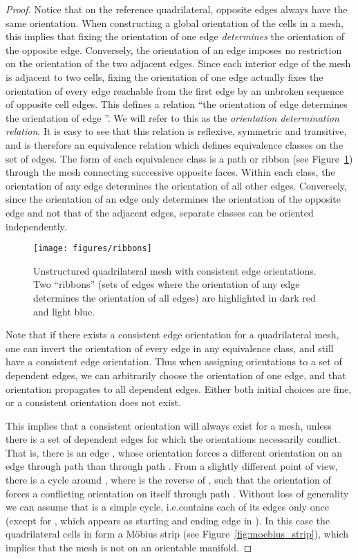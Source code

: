 \documentclass[oneeqnum,onethmnum,onefignum,onetabnum]{siamltex1213}
\begin{document}
\begin{proof}
  Notice that on the reference quadrilateral, opposite edges always have the
  same orientation. When constructing a global orientation of the cells in a
  mesh, this implies that fixing the orientation of one edge
  \emph{determines} the orientation of the opposite edge. Conversely, the
  orientation of an edge imposes no restriction on the orientation of the
  two adjacent edges. Since each interior edge of the mesh is adjacent to
  two cells, fixing the orientation of one edge actually fixes the
  orientation of every edge reachable from the first edge by an unbroken
  sequence of opposite cell edges. This defines a relation ``the orientation
  of edge  determines the orientation of edge ''.  We will refer to
  this as the \emph{orientation determination relation}. It is easy to see
  that this relation is reflexive, symmetric and transitive, and is
  therefore an equivalence relation which defines equivalence classes on
  the set of edges. The form of each equivalence class is a path or ribbon
  (see Figure~\ref{fig:ribbons})
  through the mesh connecting successive opposite faces. Within each class,
  the orientation of any edge determines the orientation of all other
  edges. Conversely, since the orientation of an edge only determines the
  orientation of the opposite edge and not that of the adjacent edges,
  separate classes can be oriented independently.

\begin{figure}
  \centering
  \texttt{[image: figures/ribbons]}

  \caption{Unstructured quadrilateral mesh with consistent edge
    orientations. Two ``ribbons'' (sets of edges where the orientation
    of any edge determines the orientation of all edges) are
    highlighted in dark red and light blue.}
  \label{fig:ribbons}
\end{figure}

Note that if there exists a consistent edge orientation for a quadrilateral
mesh, one can invert the orientation of every edge in any equivalence class,
and still have a consistent edge orientation. Thus when assigning
orientations to a set of dependent edges, we can arbitrarily choose the
orientation of one edge, and that orientation propagates to all dependent
edges. Either both initial choices are fine, or a consistent orientation
does not exist.

This implies that a consistent orientation will always exist for a mesh,
unless there is a set of dependent edges for which the orientations necessarily
conflict. That is, there is an edge , whose orientation forces a
different orientation on an edge  through path  than through path
. From a slightly different point of view, there is a cycle  around , where  is the reverse of , such that the orientation of  forces a
conflicting orientation on itself through path . Without loss of
generality we can assume that  is a simple cycle, i.e.\@  contains
each of its edges only once (except for , which appears as starting and
ending edge in ). In this case the quadrilateral cells in  form a
Möbius strip (see Figure~\ref{fig:moebius_strip}), which implies that the
mesh is not on an orientable manifold.


\end{proof}
\end{document}
